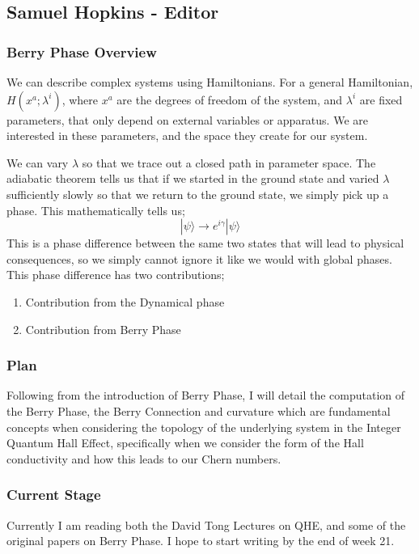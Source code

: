 \documentclass[12pt]{article}
\newcommand{\PRLsep}{\noindent\makebox[\linewidth]{\resizebox{0.3333\linewidth}{1pt}{$\bullet$}}\bigskip}
\begin{document}
\vspace{0.5cm}
\PRLsep

\newpage
\subsection*{Samuel Hopkins - Editor}
\subsubsection*{Berry Phase Overview}
We can describe complex systems using Hamiltonians. For a general Hamiltonian, $H(x^a; \lambda^i)$, where $x^a$ are the degrees of freedom of the system, and $\lambda^i$ are fixed parameters, 
that only depend on external variables or apparatus. We are interested in these parameters, and the space they create for our system. 

We can vary $\lambda$ so that we trace out a closed path in parameter space. The adiabatic theorem tells us that if we started in the ground state and varied $\lambda$ sufficiently slowly so that we 
return to the ground state, we simply pick up a phase. This mathematically tells us; 
\begin{equation*}
    |\psi \rangle \to e^{i \gamma}|\psi \rangle
\end{equation*}
This is a phase difference between the same two states that will lead to physical consequences, so we simply cannot ignore it like we would with global phases.
This phase difference has two contributions; 
\begin{enumerate}
    \item Contribution from the Dynamical phase
    \item Contribution from Berry Phase
\end{enumerate} 

\subsubsection*{Plan}
Following from the introduction of Berry Phase, I will detail the computation of the Berry Phase, the Berry Connection and curvature which 
are fundamental concepts when considering the topology of the underlying system in the Integer Quantum Hall Effect, specifically when we consider the form of the 
Hall conductivity and how this leads to our Chern numbers.

\subsubsection*{Current Stage}
Currently I am reading both the David Tong Lectures on QHE, and some of the original papers on Berry Phase. I hope to start writing by the end of week 21.
\end{document}
